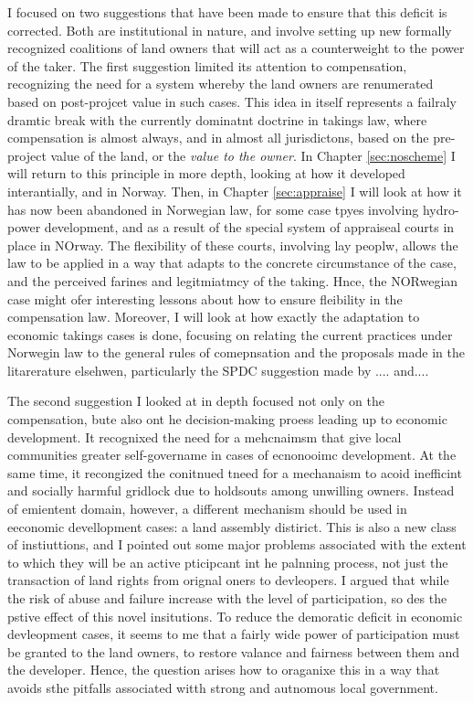 I focused on two suggestions that have been made to ensure that this deficit is corrected. Both are institutional in nature, and involve setting up new formally recognized coalitions of land owners that will act as a counterweight to the power of the taker. The first suggestion limited its attention to compensation, recognizing the need for a system whereby the land owners are renumerated based on post-projcet value in such cases. This idea in itself represents a failraly dramtic break with the currently dominatnt doctrine in takings law, where compensation is almost always, and in almost all jurisdictons, based on the pre-project value of the land, or the {\it value to the owner}. In Chapter \ref{sec:noscheme} I will return to this principle in more depth, looking at how it developed interantially, and in Norway. Then, in Chapter \ref{sec:appraise} I will look at how it has now been abandoned in Norwegian law, for some case tpyes involving hydro-power development, and as a result of the special system of appraiseal courts in place in NOrway. The flexibility of these courts, involving lay peoplw, allows the law to be applied in a way that adapts to the concrete circumstance of the case, and the perceived farines and legitmiatmcy of the taking. Hnce, the NORwegian case might ofer interesting lessons about how to ensure fleibility in the compensation law. Moreover, I will look at how exactly the adaptation to economic takings cases is done, focusing on relating the current practices under Norwegin law to the general rules of comepnsation and the proposals made in the litarerature elsehwen, particularly the SPDC suggestion made by .... and.... 

The second suggestion I looked at in depth focused not only on the compensation, bute also ont he decision-making proess leading up to economic development. It recognixed the need for a mehcnaimsm that give local communities greater self-govername in cases of ecnonooimc development. At the same time, it recongized the conitnued tneed for  a mechanaism to acoid inefficint and socially harmful gridlock due to holdsouts among unwilling owners. Instead of emientent domain, however, a different mechanism should be used in eeconomic devellopment cases: a land assembly distirict. This is also a new class of instiuttions, and I pointed out some major problems associated with the extent to which they will be an active pticipcant int he palnning process, not just the transaction of land rights from orignal oners to devleopers. I argued that while the risk of abuse and failure increase with the level of participation, so des the pstive effect of this novel insitutions. To reduce the demoratic deficit in economic devleopment cases, it seems to me that a fairly wide power of participation must be granted to the land owners, to restore valance and fairness between them and the developer. Hence, the question arises how to oraganixe this in a way that avoids sthe pitfalls associated witth strong and autnomous local government. 

